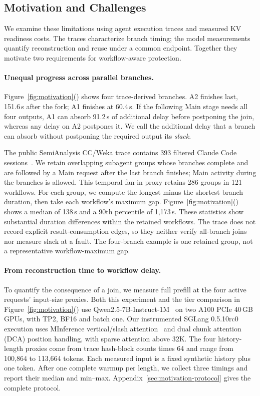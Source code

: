 \subsection{Motivation and Challenges}

We examine these limitations using agent execution traces and measured
KV readiness costs. The traces characterize branch timing; the model
measurements quantify reconstruction and reuse under a common endpoint.
Together they motivate two requirements for workflow-aware protection.

\paragraph{Unequal progress across parallel branches.}
\label{sec:motivation-workflow}
Figure~\ref{fig:motivation}() shows four
trace-derived branches. A2 finishes last, 151.6\,s after the fork;
A1 finishes at 60.4\,s. If the following Main stage needs all four outputs,
A1 can absorb 91.2\,s of additional delay before postponing the join,
whereas any delay on A2 postpones it. We call the additional delay that
a branch can absorb without postponing the required output its
\emph{slack}.

The public SemiAnalysis CC/Weka trace contains 393 filtered Claude Code
sessions~\cite{semianalysis2026cctraces}. We retain overlapping subagent
groups whose branches complete and are followed by a Main request after
the last branch finishes; Main activity during the branches is allowed.
This temporal fan-in proxy retains 286 groups in 121 workflows.
For each group, we compute the longest minus the shortest branch duration,
then take each workflow's maximum gap.
Figure~\ref{fig:motivation}() shows a
median of 138\,s and a 90th percentile of 1,173\,s. These statistics show
substantial duration differences within the retained workflows.
The trace does not record explicit result-consumption edges, so they
neither verify all-branch joins nor measure slack at a fault. The
four-branch example is one retained group, not a representative
workflow-maximum gap.

\paragraph{From reconstruction time to workflow delay.}
To quantify the consequence of a join, we measure full prefill at the
four active requests' input-size proxies. Both this experiment and the
tier comparison in Figure~\ref{fig:motivation}()
use Qwen2.5-7B-Instruct-1M~\cite{qwen2025qwen25oneM} on two A100 PCIe
40\,GB GPUs, with TP2, BF16 and batch one. Our instrumented SGLang
0.5.10rc0 execution uses MInference vertical/slash
attention~\cite{jiang2024minference} and dual chunk attention (DCA)
position handling, with sparse attention above 32K.
The four history-length proxies come from trace hash-block counts times
64 and range from 100,864 to 113,664 tokens. Each measured input is a
fixed synthetic history plus one token. After one complete warmup per
length, we collect three timings and report their median and min--max.
Appendix~\ref{sec:motivation-protocol} gives the complete protocol.

